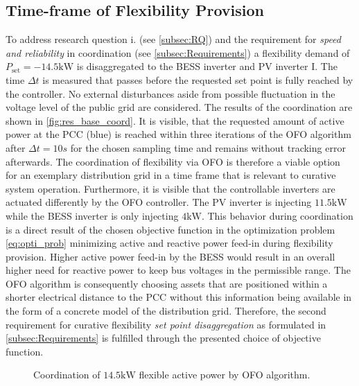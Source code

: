 \documentclass[conference,a4paper]{IEEEtran}
\begin{document}
\subsection{Time-frame of Flexibility Provision}
To address research question i. (see \ref{subsec:RQ}) and the requirement for \emph{speed and reliability} in coordination (see \ref{subsec:Requirements}) a flexibility demand of $P_{\text{set}} = -14.5 \text{kW}$ is disaggregated to the BESS inverter and PV inverter I. The time $\Delta t$ is measured that passes before the requested set point is fully reached by the controller. No external disturbances aside from possible fluctuation in the voltage level of the public grid are considered. The results of the coordination are shown in \autoref{fig:res_base_coord}. It is visible, that the requested amount of active power at the PCC (blue) is reached within three iterations of the OFO algorithm after $\Delta t=10s$ for the chosen sampling time and remains without tracking error afterwards. The coordination of flexibility via OFO is therefore a viable option for an exemplary distribution grid in a time frame that is relevant to curative system operation. Furthermore, it is visible that the controllable inverters are actuated differently by the OFO controller. The PV inverter is injecting $11.5 \text{kW}$ while the BESS inverter is only injecting $4 \text{kW}$. This behavior during coordination is a direct result of the chosen objective function in the optimization problem \eqref{eq:opti_prob} minimizing active and reactive power feed-in during flexibility provision. Higher active power feed-in by the BESS would result in an overall higher need for reactive power to keep bus voltages in the permissible range. The OFO algorithm is consequently choosing assets that are positioned within a shorter electrical distance to the PCC without this information being available in the form of a concrete model of the distribution grid. Therefore, the second requirement for curative flexibility \emph{set point disaggregation} as formulated in \autoref{subsec:Requirements} is fulfilled through the presented choice of objective function.
\begin{figure}[b]
    \vspace{-1em}
    
    \caption{Coordination of $14.5 \text{kW}$ flexible active power by OFO algorithm.}
    \label{fig:res_base_coord}
\end{figure}
\end{document}
